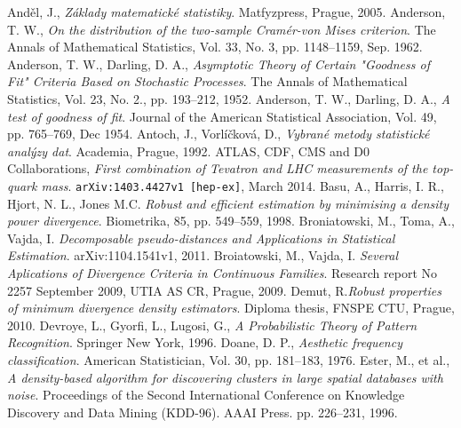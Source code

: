 
\begin{thebibliography}{10}
%
And\v{e}l, J., {\em Z\'aklady matematick\'e statistiky}. Matfyzpress, Prague, 2005.
Anderson, T. W., {\em On the distribution of the two-sample Cram\'er-von Mises criterion}. The Annals of Mathematical Statistics, Vol. 33, No. 3, pp. 1148--1159, Sep. 1962.
Anderson, T. W., Darling, D. A., {\em Asymptotic Theory of Certain "Goodness of Fit" Criteria Based on Stochastic Processes}. The Annals of Mathematical Statistics, Vol. 23, No. 2., pp. 193--212, 1952.
Anderson, T. W., Darling, D. A., {\em A test of goodness of fit}. Journal of the American Statistical Association, Vol. 49, pp. 765--769, Dec 1954.
Antoch, J., Vorl\'i\v{c}kov\'a, D., {\em Vybran\'e metody statistick\'e anal\'yzy dat}. Academia, Prague, 1992.
ATLAS, CDF, CMS and D0 Collaborations, {\em First combination of Tevatron and LHC measurements of the top-quark mass}. \texttt{arXiv:1403.4427v1 [hep-ex]}, March 2014.
Basu, A., Harris, I. R., Hjort, N. L., Jones M.C. {\em Robust and efficient estimation by minimising a density power divergence}. Biometrika, 85, pp. 549--559, 1998.
Broniatowski, M., Toma, A., Vajda, I. {\em Decomposable pseudo-distances and Applications in Statistical Estimation}. arXiv:1104.1541v1, 2011.
Broiatowski, M., Vajda, I. {\em Several Aplications of Divergence Criteria in Continuous Families}. Research report No 2257 September 2009, UTIA AS CR, Prague, 2009.
Demut, R.{\em Robust properties of minimum divergence density estimators}. Diploma thesis, FNSPE CTU, Prague, 2010.
Devroye, L., Gyorfi, L., Lugosi, G., {\em A Probabilistic Theory of Pattern Recognition}. Springer New York, 1996.
Doane, D. P., {\em Aesthetic frequency classification}. American Statistician, Vol. 30, pp. 181--183, 1976.
 Ester, M., et al., {\em A density-based algorithm for discovering clusters in large spatial databases with noise}.  Proceedings of the Second International Conference on Knowledge Discovery and Data Mining (KDD-96). AAAI Press. pp. 226–231, 1996.

\end{thebibliography}
